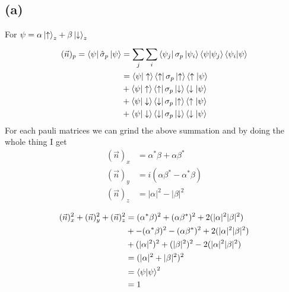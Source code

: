 \documentclass[letter, 10pts]{article}
\newcommand{\U}{\uparrow}
\newcommand{\D}{\downarrow}
\begin{document}
\subsection*{(a)} 
For $\psi = \alpha \ket{\U}_z + \beta \ket{\D}_z$ 
\begin{align*}
	(\vec{n})_p 
	=
	\bra{\psi} \hat{\sigma}_p \ket{\psi}
	&= \sum_{j}^{} \sum_{i}^{} \bra{\psi_j} \sigma_p \ket{\psi_i} \braket{\psi | \psi_j} \braket{\psi_i| \psi} \\
	&= \braket{\psi | \U}
	\bra{\U} \sigma_p \ket{\U} \braket{\U| \psi} \\
	&+ 
	\braket{\psi | \U}\bra{\U} \sigma_p \ket{\D} \braket{\D | \psi}  \\ 
	&+
	\braket{\psi | \D} \bra{\D} \sigma_p \ket{\U} \braket{\U | \psi} \\ 
	&+ 
	\braket{\psi | \D} \bra{\D} \sigma_p \ket{\D} \braket{\D | \psi}
\end{align*}
For each pauli matrices we can grind the above summation and by doing the whole thing I get 
\begin{align*}
	(\vec{n})_x &= \alpha^{*} \beta + \alpha \beta^{*} \\ 
	(\vec{n})_y &= i \left(\alpha \beta^{*} - \alpha ^{*} \beta \right) \\
	(\vec{n})_z &= |\alpha|^2 - |\beta|^2 \\
\end{align*}
\begin{align*}
	(\vec{n})_x^2 + (\vec{n})_y^2 + (\vec{n})_z^2 &= 
	(\alpha ^{*} \beta) ^2 + (\alpha \beta^{*} )^2 + 2 (|\alpha|^2 |\beta|^2)\\	
						      &+ 
							      -(\alpha ^{*} \beta)^2 -
							      (\alpha \beta^{*})^2 +
							      2 (|\alpha|^2 |\beta|^2 )
						      \\
						      &+ (| \alpha | ^2)^2 + 
						      (|\beta| ^2)^2 - 
						      2 (|\alpha|^2 |\beta|^2) \\ 
						      &= 
						      (|\alpha|^2 + |\beta|^2)^2 
						      \\
						      &= 
						      \braket{\psi | \psi}^2\\
						      &= 
						      1
\end{align*}
\end{document}
